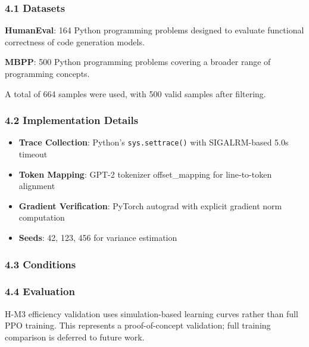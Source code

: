 
\subsubsection{4.1 Datasets}

\textbf{HumanEval}: 164 Python programming problems designed to evaluate functional correctness of code generation models.

\textbf{MBPP}: 500 Python programming problems covering a broader range of programming concepts.

A total of 664 samples were used, with 500 valid samples after filtering.

\subsubsection{4.2 Implementation Details}

\begin{itemize}
\item \textbf{Trace Collection}: Python's \texttt{sys.settrace()} with SIGALRM-based 5.0s timeout
\item \textbf{Token Mapping}: GPT-2 tokenizer offset\_mapping for line-to-token alignment
\item \textbf{Gradient Verification}: PyTorch autograd with explicit gradient norm computation
\item \textbf{Seeds}: 42, 123, 456 for variance estimation
\end{itemize}

\subsubsection{4.3 Conditions}

\begin{table}[htbp]
\centering
{}
\end{table}

\subsubsection{4.4 Evaluation}

H-M3 efficiency validation uses simulation-based learning curves rather than full PPO training. This represents a proof-of-concept validation; full training comparison is deferred to future work.

